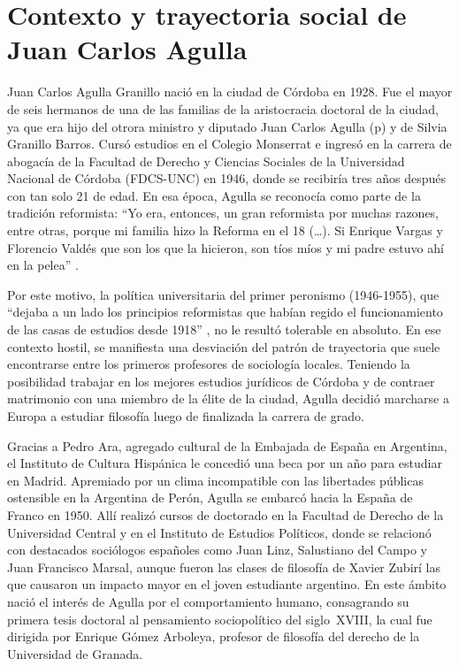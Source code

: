 \section{Contexto y trayectoria social de Juan Carlos Agulla}

Juan Carlos Agulla Granillo nació en la ciudad de Córdoba en 1928. Fue el mayor de seis hermanos de una de las familias de la aristocracia doctoral de la ciudad, ya que era hijo del otrora ministro y diputado Juan Carlos Agulla (p) y de Silvia Granillo Barros. Cursó estudios en el Colegio Monserrat e ingresó en la carrera de abogacía de la Facultad de Derecho y Ciencias Sociales de la Universidad Nacional de Córdoba (FDCS-UNC) en 1946, donde se recibiría tres años después con tan solo 21 de edad. En esa época, Agulla se reconocía como parte de la tradición reformista: \enquote{Yo era, entonces, un gran reformista por muchas razones, entre otras, porque mi familia hizo la Reforma en el 18 (\dots). Si Enrique Vargas y Florencio Valdés que son los que la hicieron, son tíos míos y mi padre estuvo ahí en la pelea} \parencite[276]{1626-FUCITO2004}.

Por este motivo, la política universitaria del primer peronismo (1946-1955), que \enquote{dejaba a un lado los principios reformistas que habían regido el funcionamiento de las casas de estudios desde 1918} \parencite[152]{1536-BUCHBINDER2010}, no le resultó tolerable en absoluto. En ese contexto hostil, se manifiesta una desviación del patrón de trayectoria que suele encontrarse entre los primeros profesores de sociología locales. Teniendo la posibilidad trabajar en los mejores estudios jurídicos de Córdoba y de contraer matrimonio con una miembro de la élite de la ciudad, Agulla decidió marcharse a Europa a estudiar filosofía luego de finalizada la carrera de grado.

Gracias a Pedro Ara, agregado cultural de la Embajada de España en Argentina, el Instituto de Cultura Hispánica le concedió una beca por un año para estudiar en Madrid. Apremiado por un clima incompatible con las libertades públicas ostensible en la Argentina de Perón, Agulla se embarcó hacia la España de Franco en 1950. Allí realizó cursos de doctorado en la Facultad de Derecho de la Universidad Central y en el Instituto de Estudios Políticos, donde se relacionó con destacados sociólogos españoles como Juan Linz, Salustiano del Campo y Juan Francisco Marsal, aunque fueron las clases de filosofía de Xavier Zubirí las que causaron un impacto mayor en el joven estudiante argentino. En este ámbito nació el interés de Agulla por el comportamiento humano, consagrando su primera tesis doctoral al pensamiento sociopolítico del siglo~XVIII, la cual fue dirigida por Enrique Gómez Arboleya, profesor de filosofía del derecho de la Universidad de Granada.

